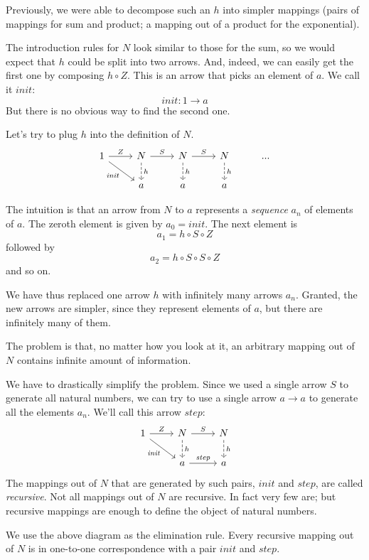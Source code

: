 \documentclass[DaoFP]{subfiles}
\begin{document}
Previously, we were able to decompose such an $h$ into simpler mappings (pairs of mappings for sum and product; a mapping out of a product for the exponential). 

The introduction rules for $N$ look similar to those for the sum, so we would expect that $h$ could be split into two arrows. And, indeed, we can easily get the first one by composing $h \circ Z$. This is an arrow that picks an element of $a$. We call it $\mathit{init}$:
\[\mathit{init} \colon 1 \to a \]
But there is no obvious way to find the second one. 


Let's try to plug $h$ into the definition of $N$.
\[
 \begin{tikzcd}
 1
 \arrow[r, "Z"]
 \arrow[rd, "\mathit{init}"']
 &N
  \arrow[r, "S"]
\arrow[d, dashed, "h"]
&N
  \arrow[r, "S"]
\arrow[d, dashed, "h"]
&N
\arrow[d, dashed, "h"]
& ...
\\
& a
& a
& a
  \end{tikzcd}
\]

The intuition is that an arrow from $N$ to $a$ represents a \emph{sequence} $a_n$ of elements of $a$. The zeroth element is given by $a_0=\mathit{init}$. The next element is
\[a_1 = h \circ S \circ Z \]
followed by
\[a_2 = h \circ S \circ S \circ Z \]
and so on.

We have thus replaced one arrow $h$ with infinitely many arrows $a_n$. Granted, the new arrows are simpler, since they represent elements of $a$, but there are infinitely many of them. 

The problem is that, no matter how you look at it, an arbitrary mapping out of $N$ contains infinite amount of information.

We have to drastically simplify the problem. Since we used a single arrow $S$ to generate all natural numbers, we can try to use a single arrow $a \to a$ to generate all the elements $a_n$. We'll call this arrow $\mathit{step}$:
\[
 \begin{tikzcd}
 1
 \arrow[r, "Z"]
 \arrow[rd, "\mathit{init}"']
 &N
  \arrow[r, "S"]
\arrow[d, dashed, "h"]
&N
\arrow[d, dashed, "h"]
\\
& a
\arrow[r, "\mathit{step}"]
& a
  \end{tikzcd}
\]
The mappings out of $N$ that are generated by such pairs, $\mathit{init}$ and $\mathit{step}$, are called \emph{recursive}. Not all mappings out of $N$ are recursive. In fact very few are; but recursive mappings are enough to define the object of natural numbers. 

We use the above diagram as the elimination rule. Every recursive mapping out of $N$ is in one-to-one correspondence with a pair $\mathit{init}$ and $\mathit{step}$. 
\end{document}

